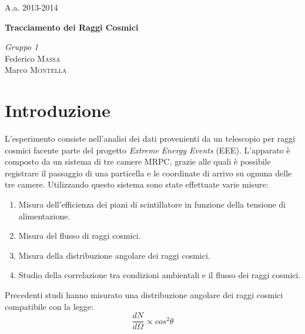 \documentclass[8pt]{extarticle}
\begin{document}
\justify
\printindex
\Large{A.a. 2013-2014}
\vspace{10cm}
\begin{center}
\Huge\textbf{Tracciamento dei Raggi Cosmici}
\end{center}

\vspace{2cm}
\begin{flushleft}
\textit{Gruppo \textsc{1}} \\
\medskip
Federico \textsc{Massa} \\ 
Marco \textsc{Montella}
\end{flushleft}



\newpage

\begin{abstract}
\justify
 

\end{abstract}
\bigskip

\section{Introduzione} \label{sec:intro}
L'esperimento consiste nell'analisi dei dati provenienti da un telescopio per raggi cosmici facente parte del progetto \textit{Extreme Energy Events} (EEE). L'apparato è composto da un sistema di tre camere MRPC, grazie alle quali è possibile registrare il passaggio di una particella e le coordinate di arrivo su ognuna delle tre camere. Utilizzando questo sistema sono state effettuate varie misure: \\

\begin{enumerate}
\item Misura dell'efficienza dei piani di scintillatore in funzione della tensione di alimentazione.
\item Misura del flusso di raggi cosmici.
\item Misura della distribuzione angolare dei raggi cosmici.
\item Studio della correlazione tra condizioni ambientali e il flusso dei raggi cosmici.
\end{enumerate}

Precedenti studi\cite{cos2} hanno misurato una distribuzione angolare dei raggi cosmici compatibile con la legge: \\

\begin{equation}
\frac{dN}{d\Omega} \propto cos^2 \theta
\nonumber
\end{equation}
\end{document}

